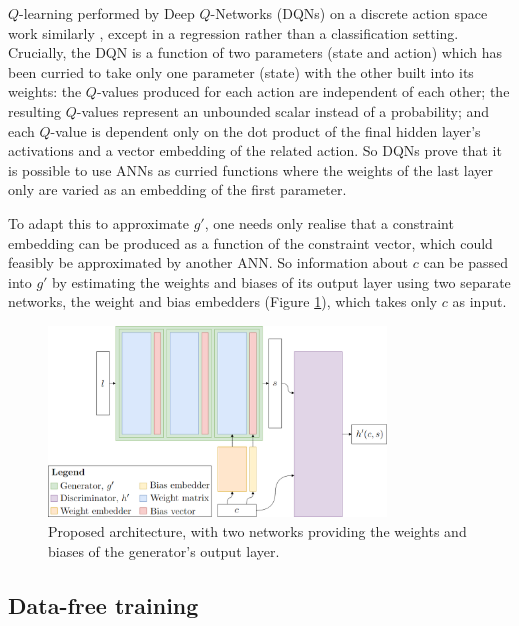 \documentclass[../../main.tex]{subfiles}
\begin{document}
$Q$-learning performed by Deep $Q$-Networks (DQNs) on a discrete action space work similarly \cite{mnih15}, except in a regression rather than a classification setting.
Crucially, the DQN is a function of two parameters (state and action) which has been curried to take only one parameter (state) with the other built into its weights: the $Q$-values produced for each action are independent of each other; the resulting $Q$-values represent an unbounded scalar instead of a probability; and each $Q$-value is dependent only on the dot product of the final hidden layer's activations and a vector embedding of the related action.
So DQNs prove that it is possible to use ANNs as curried functions where the weights of the last layer only are varied as an embedding of the first parameter.

To adapt this to approximate $g'$, one needs only realise that a constraint embedding can be produced as a function of the constraint vector, which could feasibly be approximated by another ANN.
So information about $c$ can be passed into $g'$ by estimating the weights and biases of its output layer using two separate networks, the weight and bias embedders (Figure \ref{fig:curriedGenerator}), which takes only $c$ as input.
\begin{figure}[H]
    \begin{center}
    \includegraphics[width=0.8\textwidth]{curriedGenerator}
    \caption[Modified GAN architecture]{
		Proposed architecture, with two networks providing the weights and biases of the generator's output layer.
    }
    \label{fig:curriedGenerator}
    \end{center}
\end{figure}

\subsection{Data-free training} \label{subsection:dataFreeTraining}
\end{document}
